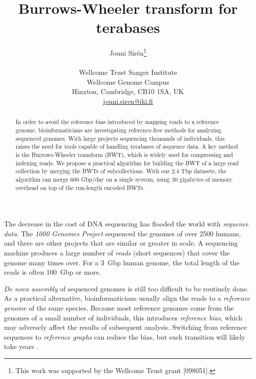 \documentclass[smallabstract,smallcaptions]{dccpaper}
\begin{document}
\title
{\vspace{-12pt}\large
\textbf{Burrows-Wheeler transform for terabases}
}


\author{%
Jouni Sirén\thanks{This work was supported by the Wellcome Trust grant [098051].} \\[0.5em]
{\small\begin{minipage}{\linewidth}\begin{center}
\begin{tabular}{c}
Wellcome Trust Sanger Institute \\
Wellcome Genome Campus \\
Hinxton, Cambridge, CB10 1SA, UK \\
\url{jouni.siren@iki.fi}
\end{tabular}
\end{center}\end{minipage}}
}


\maketitle
\thispagestyle{empty}


\begin{abstract}
In order to avoid the reference bias introduced by mapping reads to a reference genome, bioinformaticians are investigating reference-free methods for analyzing sequenced genomes. With large projects sequencing thousands of individuals, this raises the need for tools capable of handling terabases of sequence data. A key method is the Burrows-Wheeler transform (BWT), which is widely used for compressing and indexing reads. We propose a practical algorithm for building the BWT of a large read collection by merging the BWTs of subcollections. With our 2.4 Tbp datasets, the algorithm can merge 600 Gbp/day on a single system, using 30 gigabytes of memory overhead on top of the run-length encoded BWTs.
\end{abstract}



The decrease in the cost of DNA sequencing has flooded the world with \emph{sequence data}. The \emph{1000 Genomes Project} \cite{1000GP2015} sequenced the genomes of over 2500 humans, and there are other projects that are similar or greater in scale. A sequencing machine produces a large number of \emph{reads} (short sequences) that cover the genome many times over. For a 3~Gbp human genome, the total length of the reads is often 100~Gbp or more.

\emph{De novo assembly} of sequenced genomes is still too difficult to be routinely done. As a practical alternative, bioinformaticians usually align the reads to a \emph{reference genome} of the same species. Because most reference genomes come from the genomes of a small number of individuals, this introduces \emph{reference bias}, which may adversely affect the results of subsequent analysis. Switching from reference sequences to \emph{reference graphs} can reduce the bias, but such transition will likely take years \cite{Church2015}.
\end{document}
